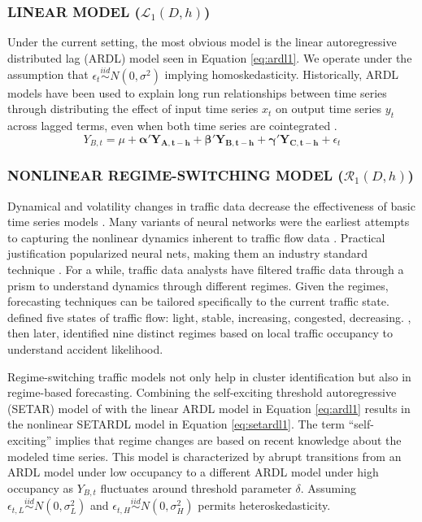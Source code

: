 \subsubsection{LINEAR MODEL ($\mathcal{L}_1(D,h)$)}
Under the current setting, the most obvious model is the linear autoregressive distributed lag (ARDL) model seen in Equation \ref{eq:ardl1}. We operate under the assumption that $\epsilon_t \overset{iid}\sim N(0,\sigma^2)$ implying homoskedasticity. Historically, ARDL models have been used to explain long run relationships between time series through distributing the effect of input time series $x_t$ on output time series $y_t$ across lagged terms, even when both time series are cointegrated  \citep{Pesaran1998,Hassler2006}.
\begin{equation}
\label{eq:ardl1}
Y_{B,t}=\mu+\bm{\alpha}'\bm{Y_{A,t-h}}+\bm{\beta}'\bm{Y_{B,t-h}}+\bm{\gamma}'\bm{Y_{C,t-h}}+\epsilon_t
\end{equation}

\subsubsection{NONLINEAR REGIME-SWITCHING MODEL  ($\mathcal{R}_1(D,h)$)}
Dynamical \citep{Queen2009} and volatility changes \citep{Vlahogianni2011} in traffic data decrease the effectiveness of basic time series models \citep{Vlahogianni2004}. Many variants of neural networks were the earliest attempts to capturing the nonlinear dynamics inherent to traffic flow data \cite{Smith1997}. Practical justification popularized neural nets, making them an industry standard technique \citep{Ledoux1997}. For a while, traffic data analysts have filtered traffic data through a prism to understand dynamics through different regimes. Given the regimes, forecasting techniques can be tailored specifically to the current traffic state\citep{Danech1991,Voort1996}. \cite{Zhu2012} defined five states of traffic flow: light, stable, increasing, congested, decreasing. \cite{Xu2012}, then later\cite{Theofilatos2017},  identified nine distinct regimes based on local traffic occupancy to understand accident likelihood.
 
Regime-switching traffic models not only help in cluster identification\citep{Kamarianakis2010,Kamarianakis2012} but also in  regime-based forecasting\citep{Dunne2012}. Combining the self-exciting threshold autoregressive (SETAR) model of \cite{Ghaddar1981} with the linear ARDL model in Equation \ref{eq:ardl1} results in the nonlinear SETARDL model in Equation \ref{eq:setardl1}. The term ``self-exciting'' implies that regime changes are based on recent knowledge about the modeled time series. This model is characterized by abrupt transitions from an ARDL model under low occupancy to a different ARDL model under high occupancy as $Y_{B,t}$ fluctuates around threshold parameter $\delta$.  Assuming $\epsilon_{t,L} \overset{iid}\sim N(0,\sigma_L^2)$ and $\epsilon_{t,H} \overset{iid}\sim N(0,\sigma_H^2)$ permits heteroskedasticity.

